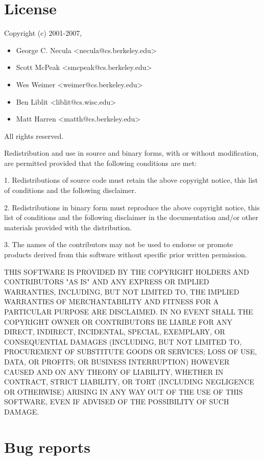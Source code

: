 \documentclass{article}
\begin{document}
\section{License}

Copyright (c) 2001-2007, 
\begin{itemize}
\item George C. Necula    <necula@cs.berkeley.edu>
\item Scott McPeak        <smcpeak@cs.berkeley.edu>
\item Wes Weimer          <weimer@cs.berkeley.edu>
\item Ben Liblit          <liblit@cs.wisc.edu>
\item Matt Harren         <matth@cs.berkeley.edu>
\end{itemize}
All rights reserved.

Redistribution and use in source and binary forms, with or without
modification, are permitted provided that the following conditions are met:

1. Redistributions of source code must retain the above copyright notice,
this list of conditions and the following disclaimer.

2. Redistributions in binary form must reproduce the above copyright notice,
this list of conditions and the following disclaimer in the documentation
and/or other materials provided with the distribution.

3. The names of the contributors may not be used to endorse or promote
products derived from this software without specific prior written
permission.

THIS SOFTWARE IS PROVIDED BY THE COPYRIGHT HOLDERS AND CONTRIBUTORS "AS IS"
AND ANY EXPRESS OR IMPLIED WARRANTIES, INCLUDING, BUT NOT LIMITED TO, THE
IMPLIED WARRANTIES OF MERCHANTABILITY AND FITNESS FOR A PARTICULAR PURPOSE
ARE DISCLAIMED. IN NO EVENT SHALL THE COPYRIGHT OWNER OR CONTRIBUTORS BE
LIABLE FOR ANY DIRECT, INDIRECT, INCIDENTAL, SPECIAL, EXEMPLARY, OR
CONSEQUENTIAL DAMAGES (INCLUDING, BUT NOT LIMITED TO, PROCUREMENT OF
SUBSTITUTE GOODS OR SERVICES; LOSS OF USE, DATA, OR PROFITS; OR BUSINESS
INTERRUPTION) HOWEVER CAUSED AND ON ANY THEORY OF LIABILITY, WHETHER IN
CONTRACT, STRICT LIABILITY, OR TORT (INCLUDING NEGLIGENCE OR OTHERWISE)
ARISING IN ANY WAY OUT OF THE USE OF THIS SOFTWARE, EVEN IF ADVISED OF THE
POSSIBILITY OF SUCH DAMAGE.

\section{Bug reports}
 
\end{document}
